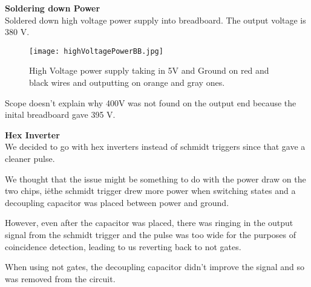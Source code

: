 \documentclass[oneside]{tufte-book}
\newenvironment{loggentry}[2]%
{\noindent\huge{\textbf{#2}}\normalsize\vspace{0.5cm}\marginnote{#1}\\}{\vspace{0.5cm}}
\begin{document}
  \begin{loggentry}{2018-Aug-31}{Soldering down Power}
    Soldered down high voltage power supply into breadboard. The output voltage is 380 V.

    \begin{figure}
        \centering
        \texttt{[image: highVoltagePowerBB.jpg]}
        \caption{High Voltage power supply taking in 5V and Ground on red and black wires and outputting on orange and gray ones.}
        \label{highVoltagePowerSolder}
    \end{figure}

    Scope doesn't explain why 400V was not found on the output end because the inital breadboard gave 395 V.
  \end{loggentry}

  \begin{loggentry}{2018-Sep-3}{Hex Inverter}
    We decided to go with hex inverters instead of schmidt triggers since that gave a cleaner pulse.

    We thought that the issue might be something to do with the power draw on the two chips, i\.e\. the schmidt trigger drew more power when switching states and a decoupling capacitor was placed between power and ground.

    However, even after the capacitor was placed, there was ringing in the output signal from the schmidt trigger and the pulse was too wide for the purposes of coincidence detection, leading to us reverting back to not gates.

    When using not gates, the decoupling capacitor didn't improve the signal and so was removed from the circuit.
  \end{loggentry}
\end{document}
